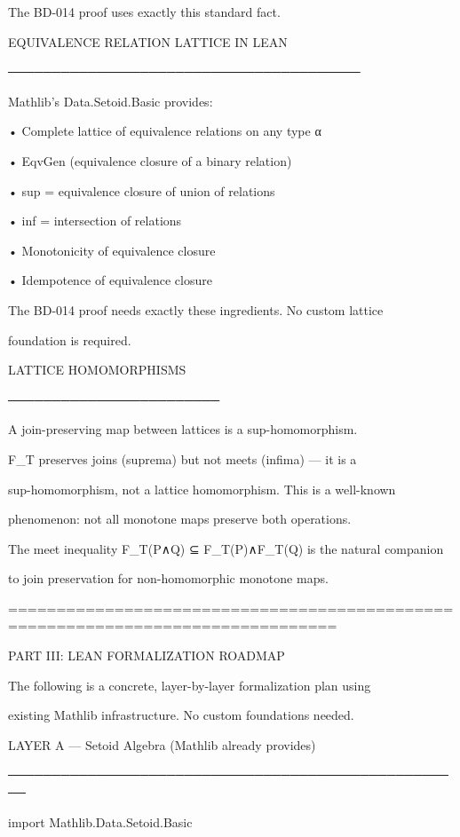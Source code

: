 The BD-014 proof uses exactly this standard fact.




EQUIVALENCE RELATION LATTICE IN LEAN

────────────────────────────────────────

Mathlib's Data.Setoid.Basic provides:

• Complete lattice of equivalence relations on any type α

• EqvGen (equivalence closure of a binary relation)

• sup = equivalence closure of union of relations

• inf = intersection of relations

• Monotonicity of equivalence closure

• Idempotence of equivalence closure




The BD-014 proof needs exactly these ingredients. No custom lattice

foundation is required.




LATTICE HOMOMORPHISMS

────────────────────────

A join-preserving map between lattices is a sup-homomorphism.

F_T preserves joins (suprema) but not meets (infima) — it is a

sup-homomorphism, not a lattice homomorphism. This is a well-known

phenomenon: not all monotone maps preserve both operations.




The meet inequality F_T(P∧Q) ⊆ F_T(P)∧F_T(Q) is the natural companion

to join preservation for non-homomorphic monotone maps.


================================================================================

PART III: LEAN FORMALIZATION ROADMAP


The following is a concrete, layer-by-layer formalization plan using

existing Mathlib infrastructure. No custom foundations needed.


LAYER A — Setoid Algebra (Mathlib already provides)

────────────────────────────────────────────────────

import Mathlib.Data.Setoid.Basic


